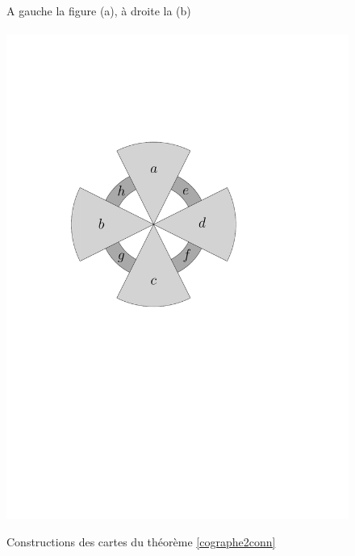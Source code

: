 \documentclass{scrartcl}
\begin{document}
\begin{flushleft}
\begin{figure}[h]
    \caption{Constructions des cartes du théorème \ref{cographe2conn}}\label{cographemap}
    \begin{center}
        A gauche la figure (a), à droite la (b)
        \\~\\
        \includegraphics[page = \ipeFigpointabuse, scale = 0.4]{figs}
        \hspace*{1.5cm}

\end{center}
\end{figure}
\end{flushleft}
\end{document}
